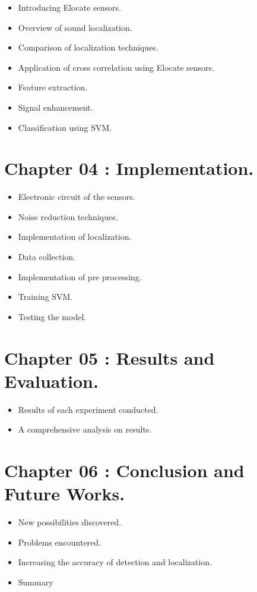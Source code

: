\documentclass[11pt]{article}
\numberwithin{figure}{section}
\numberwithin{table}{section}
\begin{document}
\begin{itemize}
  \item Introducing Elocate sensors.
  \item Overview of sound localization. 
  \item Comparison of localization techniques.
  \item Application of cross correlation using Elocate sensors.
  \item Feature extraction.
  \item Signal enhancement.
  \item Classification using SVM.
\end{itemize}

\newpage
\section*{Chapter 04 : Implementation.}
\begin{itemize}
  \item Electronic circuit of the sensors.
  \item Noise reduction techniques.
  \item Implementation of localization.
  \item Data collection.
  \item Implementation of pre processing.
  \item Training SVM.
  \item Testing the model.
\end{itemize}
\section*{Chapter 05 : Results and Evaluation.}
\begin{itemize}
  \item Results of each experiment conducted.
  \item A comprehensive analysis on results.
\end{itemize}
\section*{Chapter 06 : Conclusion and Future Works.}
\begin{itemize}
  \item New possibilities discovered.
  \item Problems encountered.
  \item Increasing the accuracy of detection and localization.
  \item Summary
\end{itemize}
\newpage
\end{document}
